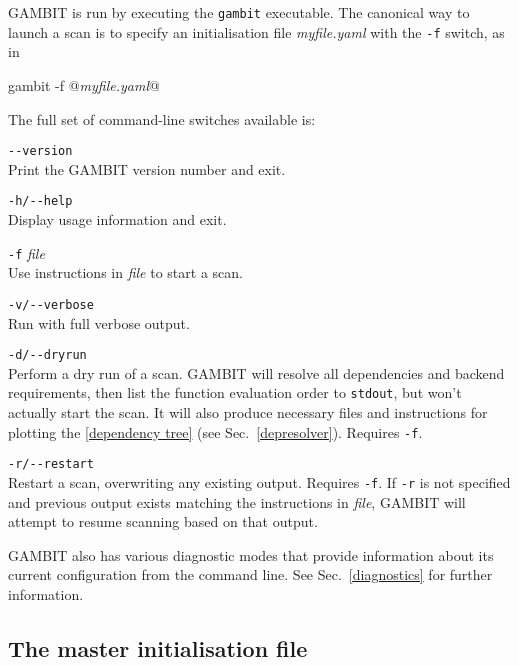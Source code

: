 \documentclass[pdftex,twocolumn,epjc3_preprint,runningheads]{svjour3}
\renewcommand{\_}{\discretionary{\underscore}{}{\underscore}}
\newcommand\term[1]{{\lstset{style=terminal}\lstinline!#1!\lstset{style=cpp}}}
\newcommand{\cross}[1]{\ref{#1}}
\newcommand{\metavarf}[1]{\textit{\color{darkgreen}\footnotesize\textrm{#1}}}
\newcommand{\metavar}{\metavarf}
\newcommand{\gambit}{\textsf{GAMBIT}\xspace}
\newcommand{\GB}{\gambit}
\begin{document}
\GB is run by executing the \term{gambit} executable.  The canonical way to launch a scan is to specify an initialisation file \metavar{myfile.yaml} with the \term{-f} switch, as in
\begin{lstterm}
gambit -f @\metavar{myfile.yaml}@
\end{lstterm}
The full set of command-line switches available is:
\begin{description}
\item\term{--version}\\ Print the \GB version number and exit.\vspace{2mm}
\item\term{-h/--help}\\ Display usage information and exit.\vspace{2mm}
\item\term{-f} \metavar{file}\\ Use instructions in \metavar{file} to start a scan.\vspace{2mm}
\item\term{-v/--verbose}\\ Run with full verbose output.\vspace{2mm}
\item\term{-d/--dryrun}\\ Perform a dry run of a scan.  \GB will resolve all dependencies and backend requirements, then list the function evaluation order to \term{stdout}, but won't actually start the scan. It will also produce necessary files and instructions for plotting the \cross{dependency tree} (see Sec.\ \ref{depresolver}).  Requires \term{-f}.\vspace{2mm}
\item\term{-r/--restart}\\ Restart a scan, overwriting any existing output. Requires \term{-f}. If \term{-r} is not specified and previous output exists matching the instructions in \metavar{file}, \GB will attempt to resume scanning based on that output.
\end{description}

\GB also has various diagnostic modes that provide information about its current configuration from the command line.  See Sec.\ \ref{diagnostics} for further information.

\subsection{The master initialisation file}
\end{document}
